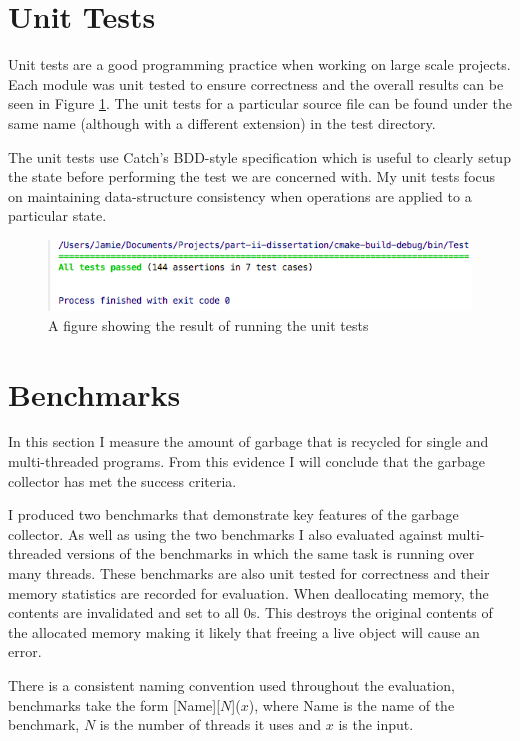 \documentclass[../diss.tex]{subfiles}
\begin{document}
\section{Unit Tests}

Unit tests are a good programming practice when working on large scale projects. Each module was unit tested to ensure correctness and the overall results can be seen in Figure \ref{fig:unittests}. The unit tests for a particular source file can be found under the same name (although with a different extension) in the test directory.

The unit tests use Catch's BDD-style specification which is useful to clearly setup the state before performing the test we are concerned with. My unit tests focus on maintaining data-structure consistency when operations are applied to a particular state.

\begin{figure}[h]
    \centering
    \includegraphics[max width=\linewidth]{figs/unittests.png}
    \caption{A figure showing the result of running the unit tests}
    \label{fig:unittests}
\end{figure}

\section{Benchmarks} \label{sec:benchmarks}

In this section I measure the amount of garbage that is recycled for single and multi-threaded programs. From this evidence I will conclude that the garbage collector has met the success criteria.

I produced two benchmarks that demonstrate key features of the garbage collector. As well as using the two benchmarks I also evaluated against multi-threaded versions of the benchmarks in which the same task is running over many threads. These benchmarks are also unit tested for correctness and their memory statistics are recorded for evaluation. When deallocating memory, the contents are invalidated and set to all 0s. This destroys the original contents of the allocated memory making it likely that freeing a live object will cause an error.

There is a consistent naming convention used throughout the evaluation, benchmarks take the form [Name][$N$]($x$), where Name is the name of the benchmark, $N$ is the number of threads it uses and $x$ is the input.
\end{document}
